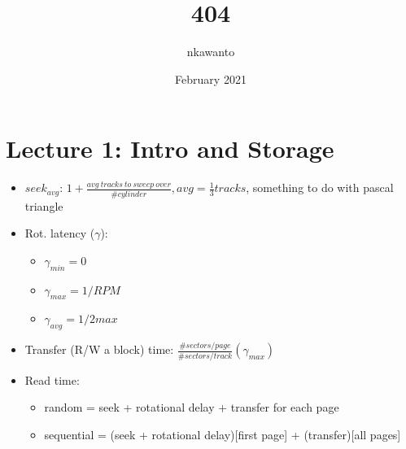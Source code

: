 \documentclass{article}
\title{404}
\author{nkawanto }
\date{February 2021}
\begin{document}
\maketitle

\section{Lecture 1: Intro and Storage}
\begin{itemize}
\item $seek_{avg}$:
    \subitem $1 + \displaystyle\frac{avg\ tracks\ to\ sweep\ over}{\#cylinder}, avg = \frac{1}{3}tracks$, something to do with pascal triangle
\item {Rot. latency ($\gamma$):}
    \begin{itemize}
        \item $\gamma_{min} = 0$
        \item $\gamma_{max} = 1/RPM$
        \item $\gamma_{avg} = 1/2 max$
    \end{itemize}
\item Transfer (R/W a block) time:
    \subitem $\displaystyle\frac{\#sectors/page}{\#sectors/track}(\gamma_{max})$
\item Read time:
    \begin{itemize}
        \item random = seek + rotational delay + transfer for each page
        \item sequential = (seek + rotational delay)[first page] + (transfer)[all pages]
    \end{itemize}
\end{itemize}
\end{document}

